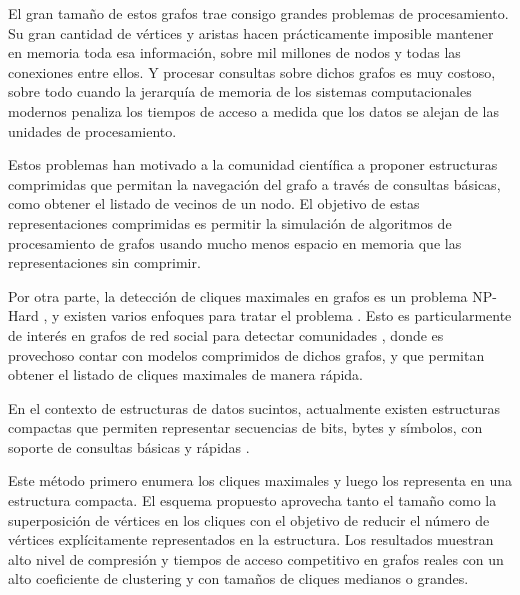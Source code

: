 El gran tamaño de estos grafos trae consigo grandes problemas de procesamiento. Su gran cantidad de vértices y aristas hacen prácticamente imposible mantener en memoria toda esa información, sobre mil millones de nodos y todas las conexiones entre ellos. Y procesar consultas sobre dichos grafos es muy costoso, sobre todo cuando la jerarquía de memoria de los sistemas computacionales modernos penaliza los tiempos de acceso a medida que los datos se alejan de las unidades de procesamiento.

Estos problemas han motivado a la comunidad científica a proponer estructuras comprimidas que permitan la navegación del grafo a través de consultas básicas, como obtener el listado de vecinos de un nodo. El objetivo de estas representaciones comprimidas es permitir la simulación de algoritmos de procesamiento de grafos usando mucho menos espacio en memoria que las representaciones sin comprimir.

Por otra parte, la detección de cliques maximales en grafos es un problema NP-Hard \cite{karp1972reducibility}, y existen varios enfoques para tratar el problema \cite{bron1973algorithm, eblen2012maximum, hendrix2010theoretical, bomze1999maximum, eppstein2010listing, eppstein2011listing}. Esto es particularmente de interés en grafos de red social para detectar comunidades \cite{modani2008large}, donde es provechoso contar con modelos comprimidos de dichos grafos, y que permitan obtener el listado de cliques maximales de manera rápida.

En el contexto de estructuras de datos sucintos, actualmente existen estructuras compactas que permiten representar secuencias de bits, bytes y símbolos, con soporte de consultas básicas y rápidas \cite{raman2002succinct, grossi2003high, claude2015wavelet}.

Este método primero enumera los cliques maximales y luego los representa en una estructura compacta. El esquema propuesto aprovecha tanto el tamaño como la superposición de vértices en los cliques con el objetivo de reducir el número de vértices explícitamente representados en la estructura. Los resultados muestran alto nivel de compresión y tiempos de acceso competitivo en grafos reales con un alto coeficiente de clustering y con tamaños de cliques medianos o grandes.







